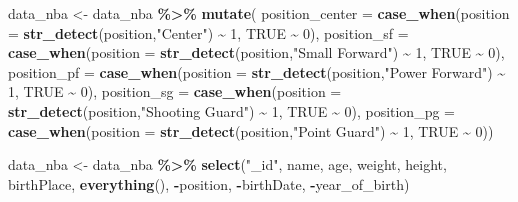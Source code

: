 \documentclass[
]{book}
\newenvironment{Shaded}{\begin{snugshade}}{\end{snugshade}}
\newcommand{\AttributeTok}[1]{\textcolor[rgb]{0.13,0.29,0.53}{#1}}
\newcommand{\ConstantTok}[1]{\textcolor[rgb]{0.56,0.35,0.01}{#1}}
\newcommand{\DecValTok}[1]{\textcolor[rgb]{0.00,0.00,0.81}{#1}}
\newcommand{\FunctionTok}[1]{\textcolor[rgb]{0.13,0.29,0.53}{\textbf{#1}}}
\newcommand{\NormalTok}[1]{#1}
\newcommand{\OtherTok}[1]{\textcolor[rgb]{0.56,0.35,0.01}{#1}}
\newcommand{\SpecialCharTok}[1]{\textcolor[rgb]{0.81,0.36,0.00}{\textbf{#1}}}
\newcommand{\StringTok}[1]{\textcolor[rgb]{0.31,0.60,0.02}{#1}}
\begin{document}
\begin{Shaded}
\begin{Highlighting}[]
\NormalTok{data\_nba }\OtherTok{\textless{}{-}}\NormalTok{ data\_nba }\SpecialCharTok{\%\textgreater{}\%}
  \FunctionTok{mutate}\NormalTok{(}
    \AttributeTok{position\_center =} 
      \FunctionTok{case\_when}\NormalTok{(}\AttributeTok{position =} \FunctionTok{str\_detect}\NormalTok{(position,}\StringTok{"Center"}\NormalTok{) }\SpecialCharTok{\textasciitilde{}} \DecValTok{1}\NormalTok{,}
                \ConstantTok{TRUE} \SpecialCharTok{\textasciitilde{}} \DecValTok{0}\NormalTok{),}
    \AttributeTok{position\_sf =} 
      \FunctionTok{case\_when}\NormalTok{(}\AttributeTok{position =} \FunctionTok{str\_detect}\NormalTok{(position,}\StringTok{"Small Forward"}\NormalTok{) }\SpecialCharTok{\textasciitilde{}} \DecValTok{1}\NormalTok{,}
                \ConstantTok{TRUE} \SpecialCharTok{\textasciitilde{}} \DecValTok{0}\NormalTok{),}
    \AttributeTok{position\_pf =} 
      \FunctionTok{case\_when}\NormalTok{(}\AttributeTok{position =} \FunctionTok{str\_detect}\NormalTok{(position,}\StringTok{"Power Forward"}\NormalTok{) }\SpecialCharTok{\textasciitilde{}} \DecValTok{1}\NormalTok{,}
                \ConstantTok{TRUE} \SpecialCharTok{\textasciitilde{}} \DecValTok{0}\NormalTok{),}
    \AttributeTok{position\_sg =} 
      \FunctionTok{case\_when}\NormalTok{(}\AttributeTok{position =} \FunctionTok{str\_detect}\NormalTok{(position,}\StringTok{"Shooting Guard"}\NormalTok{) }\SpecialCharTok{\textasciitilde{}} \DecValTok{1}\NormalTok{,}
                \ConstantTok{TRUE} \SpecialCharTok{\textasciitilde{}} \DecValTok{0}\NormalTok{),}
    \AttributeTok{position\_pg =} 
      \FunctionTok{case\_when}\NormalTok{(}\AttributeTok{position =} \FunctionTok{str\_detect}\NormalTok{(position,}\StringTok{"Point Guard"}\NormalTok{) }\SpecialCharTok{\textasciitilde{}} \DecValTok{1}\NormalTok{,}
                \ConstantTok{TRUE} \SpecialCharTok{\textasciitilde{}} \DecValTok{0}\NormalTok{))}



\NormalTok{data\_nba }\OtherTok{\textless{}{-}}\NormalTok{ data\_nba }\SpecialCharTok{\%\textgreater{}\%}
  \FunctionTok{select}\NormalTok{(}\StringTok{"\_id"}\NormalTok{, name, age, weight, height, birthPlace, }\FunctionTok{everything}\NormalTok{(), }\SpecialCharTok{{-}}\NormalTok{position, }\SpecialCharTok{{-}}\NormalTok{birthDate, }\SpecialCharTok{{-}}\NormalTok{year\_of\_birth)}
\end{Highlighting}
\end{Shaded}
\end{document}
